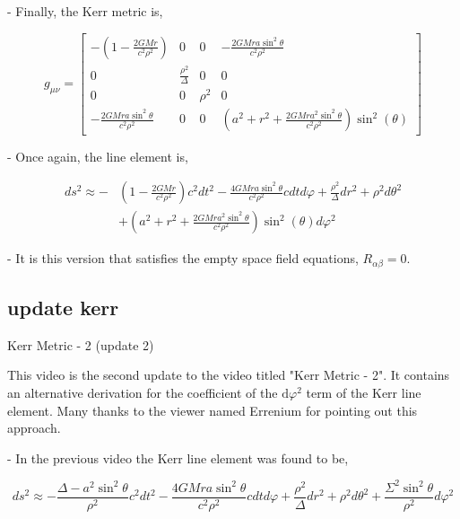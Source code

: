 - Finally, the Kerr metric is,

$$
    g_{\mu \nu}=\left[\begin{array}{cccc}
            -\left(1-\frac{2 G M r}{c^2 \rho^2}\right)   & 0                     & 0      & -\frac{2 G M r a \sin ^2 \theta}{c^2 \rho^2}                          \\
            0                                            & \frac{\rho^2}{\Delta} & 0      & 0                                                                     \\
            0                                            & 0                     & \rho^2 & 0                                                                     \\
            -\frac{2 G M r a \sin ^2 \theta}{c^2 \rho^2} & 0                     & 0      & (a^2+r^2+\frac{2 G M r a^2 \sin ^2 \theta}{c^2 \rho^2})\sin^2(\theta)
        \end{array}\right]
$$

- Once again, the line element is,


\begin{align}
    d s^2 \approx- & \left(1-\frac{2 G M r}{c^2 \rho^2}\right) c^2 d t^2-\frac{4 G M r a \sin ^2 \theta}{c^2 \rho^2} c d t d \varphi+\frac{\rho^2}{\Delta} d r^2+\rho^2 d \theta^2 \\
                   & +\left(a^2+r^2+\frac{2 G M r a^2 \sin ^2 \theta}{c^2 \rho^2}\right) \sin^2(\theta) d \varphi^2
\end{align}


- It is this version that satisfies the empty space field equations, $R_{\alpha \beta}=0$.

\subsection{update kerr}
Kerr Metric - 2 (update 2)

This video is the second update to the video titled "Kerr Metric - 2". It contains an alternative derivation for the coefficient of the $\mathrm{d} \varphi^2$ term of the Kerr line element. Many thanks to the viewer named Errenium for pointing out this approach.

- In the previous video the Kerr line element was found to be,

$$
    d s^2 \approx-\frac{\Delta-a^2 \sin ^2 \theta}{\rho^2} c^2 d t^2-\frac{4 G M r a \sin ^2 \theta}{c^2 \rho^2} c d t d \varphi+\frac{\rho^2}{\Delta} d r^2+\rho^2 d \theta^2+\frac{\Sigma^2 \sin ^2 \theta}{\rho^2} d \varphi^2
$$

